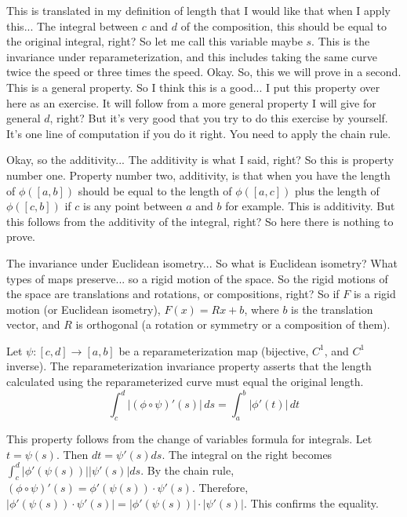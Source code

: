 \begin{spoken_clean}[00:15:30 - 00:17:49]
This is translated in my definition of length that I would like that when I apply this... The integral between $c$ and $d$ of the composition, this should be equal to the original integral, right? So let me call this variable maybe $s$. This is the invariance under reparameterization, and this includes taking the same curve twice the speed or three times the speed. Okay. So, this we will prove in a second. This is a general property. So I think this is a good... I put this property over here as an exercise. It will follow from a more general property I will give for general $d$, right? But it's very good that you try to do this exercise by yourself. It's one line of computation if you do it right. You need to apply the chain rule.

Okay, so the additivity... The additivity is what I said, right? So this is property number one. Property number two, additivity, is that when you have the length of $\phi([a,b])$ should be equal to the length of $\phi([a,c])$ plus the length of $\phi([c,b])$ if $c$ is any point between $a$ and $b$ for example. This is additivity. But this follows from the additivity of the integral, right? So here there is nothing to prove.

The invariance under Euclidean isometry... So what is Euclidean isometry? What types of maps preserve... so a rigid motion of the space. So the rigid motions of the space are translations and rotations, or compositions, right? So if $F$ is a rigid motion (or Euclidean isometry), $F(x) = Rx + b$, where $b$ is the translation vector, and $R$ is orthogonal (a rotation or symmetry or a composition of them).
\end{spoken_clean}

\begin{math_stroke}
Let $\psi: [c,d] \to [a,b]$ be a reparameterization map (bijective, $C^1$, and $C^1$ inverse). The reparameterization invariance property asserts that the length calculated using the reparameterized curve must equal the original length.
\[
\int_c^d |(\phi \circ \psi)'(s)| \, ds = \int_a^b |\phi'(t)| \, dt
\]

\begin{explanation-of-steps}
This property follows from the change of variables formula for integrals. Let $t = \psi(s)$. Then $dt = \psi'(s) ds$. The integral on the right becomes $\int_c^d |\phi'(\psi(s))| |\psi'(s)| ds$. By the chain rule, $(\phi \circ \psi)'(s) = \phi'(\psi(s)) \cdot \psi'(s)$. Therefore, $|\phi'(\psi(s)) \cdot \psi'(s)| = |\phi'(\psi(s))| \cdot |\psi'(s)|$. This confirms the equality.
\end{explanation-of-steps}
\end{math_stroke}

